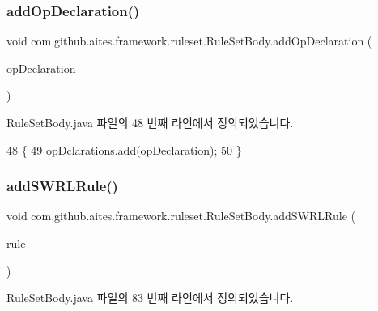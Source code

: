 \subsubsection{\texorpdfstring{add\+Op\+Declaration()}{addOpDeclaration()}}
{\footnotesize\ttfamily void com.\+github.\+aites.\+framework.\+ruleset.\+Rule\+Set\+Body.\+add\+Op\+Declaration (\begin{DoxyParamCaption}\item[{String}]{op\+Declaration }\end{DoxyParamCaption})}



Rule\+Set\+Body.\+java 파일의 48 번째 라인에서 정의되었습니다.


\begin{DoxyCode}
48                                                       \{
49         \mbox{\hyperlink{classcom_1_1github_1_1aites_1_1framework_1_1ruleset_1_1_rule_set_body_af528c6344f8e8c5b070a93bf12c440b4}{opDclarations}}.add(opDeclaration);
50     \}
\end{DoxyCode}
\mbox{\label{classcom_1_1github_1_1aites_1_1framework_1_1ruleset_1_1_rule_set_body_af7c9f7420cf0b177887893bd6d6f0618}} 
\subsubsection{\texorpdfstring{add\+S\+W\+R\+L\+Rule()}{addSWRLRule()}}
{\footnotesize\ttfamily void com.\+github.\+aites.\+framework.\+ruleset.\+Rule\+Set\+Body.\+add\+S\+W\+R\+L\+Rule (\begin{DoxyParamCaption}\item[{\mbox{\hyperlink{classcom_1_1github_1_1aites_1_1framework_1_1rule_1_1_s_w_r_lrule}{S\+W\+R\+Lrule}}}]{rule }\end{DoxyParamCaption})}



Rule\+Set\+Body.\+java 파일의 83 번째 라인에서 정의되었습니다.


